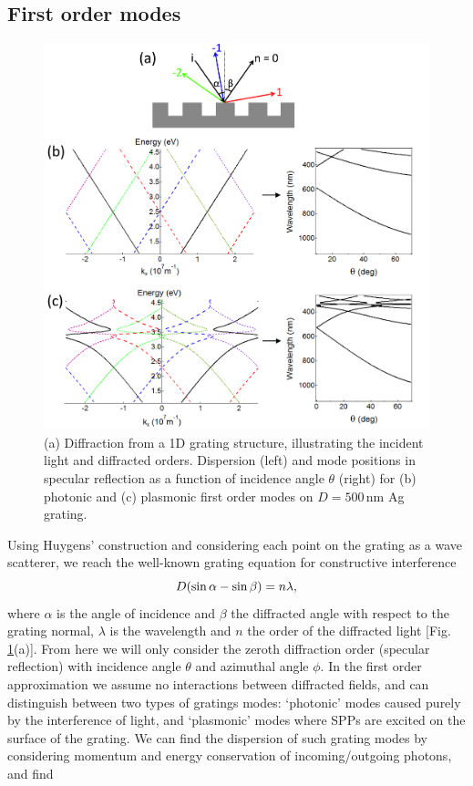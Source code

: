 \subsection{First order modes}
\begin{figure}[h!] 
\centering    
\includegraphics[width=\textwidth]{Fig3}
\caption{(a) Diffraction from a 1D grating structure, illustrating the incident light and diffracted orders. Dispersion (left) and mode positions in specular reflection as a function of incidence angle $\theta$ (right) for (b) photonic and (c) plasmonic first order modes on $D=500$\,nm Ag grating.}
\label{3Fig3}
\end{figure}
Using Huygens' construction and considering each point on the grating as a wave scatterer, we reach the well-known grating equation for constructive interference
\begin{equation}
\centering
D(\sin\alpha-\sin\beta) = n\lambda ,
\label{GratingEq}
\end{equation}
where $\alpha$ is the angle of incidence and $\beta$ the diffracted angle with respect to the grating normal, $\lambda$ is the wavelength and $n$ the order of the diffracted light [Fig.\,\ref{3Fig3}(a)]. From here we will only consider the zeroth diffraction order (specular reflection) with incidence angle $\theta$ and azimuthal angle $\phi$. In the first order approximation we assume no interactions between diffracted fields, and can distinguish between two types of gratings modes: `photonic' modes caused purely by the interference of light, and `plasmonic' modes where SPPs are excited on the surface of the grating. We can find the dispersion of such grating modes by considering momentum and energy conservation of incoming/outgoing photons, and find
